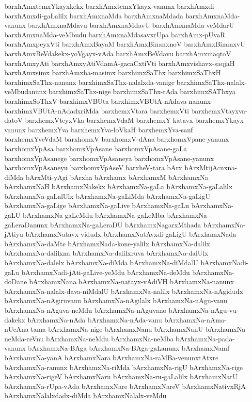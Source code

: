 {barxhAmxtemxYkayxkekx
barxhAmxtemxYkayx-vanunx
barxhAmxdi
barxhAmxdi-gaLalilx
barxhAmxnaMda
barxhAmxnaMdada
barxhAmxnaMda-vanunx
barxhAmxnaMdavu
barxhAmxnaMdavU
barxhAmxnaMda-veMdarU
barxhAmxnaMda-veMbudu
barxhAmxnaMdasavxrUpa
barxhAmx-pUvaR
barxhAmxpeyxVti
barxhAmxBayaM
barxhAmxBinanxnoV
barxhAmxBinanxvU
barxhAmxBeVdakekx-yoVgayx-vAda
barxhAmxBeVdavu
barxhAmxmaqtoV
barxhAmxyAti
barxhAmxyAtiVdamA-gacaCxtiVti
barxhAmxvishavx-saqjaH
barxhAmxsimx
barxhAmxha-masimx
barxhimxSaThx
barxhimxSaThxH
barxhimxSaThx-nanunx
barxhimxSaThx-nalalxda-vanige
barxhimxSaThx-nalalx-veMbudanunx
barxhimxSaThx-nige
barxhimxSaThx-rAda
barxhimxSAThxya
barxhimxSoThxV
barxhimxVBUta
barxhimxVBUtA-nAdava-nanunx
barxhimxVBUtA-nAdadxriMda
barxhemxVtara
barxhemxVti
barxhemxVtayxva-datoV
barxhemxVteyxVka
barxhemxVdaM
barxhemxY-katavx
barxhemxYkayx-vanunx
barxhemxYva
barxhemxYva-loVkaH
barxhemxYva-sanf
barxhemxYveVdaM
barxhomxV
barxhomxV-dAna
barxhomxVpane-yanunx
barxhomxVpAsa
barxhomxVpAsane
barxhomxVpAsane-gaLa
barxhomxVpAsanege
barxhomxVpAsaneya
barxhomxVpAsane-yanunx
barxhomxVpAsaneyu
barxhomxVpAseV
barxheV-tara
bArx
bArxMtijAcnxna-diMda
bArxMti-yAgi
bArxha
bArxhamx
bArxhamxM
bArxhamxNa
bArxhamxNaH
bArxhamxNakekx
bArxhamxNa-gaLa
bArxhamxNa-gaLalilx
bArxhamxNa-gaLalUlx
bArxhamxNa-gaLiMda
bArxhamxNa-gaLigU
bArxhamxNa-gaLige
bArxhamxNa-gaLive
bArxhamxNa-gaLu
bArxhamxNa-gaLU
bArxhamxNa-gaLeMdu
bArxhamxNa-gaLeMba
bArxhamxNa-gaLeraDanunx
bArxhamxNa-gaLeraDU
bArxhamxNagarxMthada
bArxhamxNa-jAtiyu
bArxhamxNatavx-vidudx
bArxhamxNatAvxdi-gaLigU
bArxhamxNada
bArxhamxNa-daMte
bArxhamxNada-kone-yalilx
bArxhamxNa-dalilx
bArxhamxNa-dalilxna
bArxhamxNa-dalilxruva
bArxhamxNa-dalUlx
bArxhamxNa-dalelx
bArxhamxNa-diMda
bArxhamxNa-diMdalU
bArxhamxNadi-gaLu
bArxhamxNadi-jAti-gaLive-yeMdu
bArxhamxNa-deMdu
bArxhamxNa-doDane
bArxhamxNana
bArxhamxNa-natayx-vAdiVH
bArxhamxNa-nanunx
bArxhamxNa-nalalx-dava-niMdalU
bArxhamxNa-nalilx
bArxhamxNa-nAgidudx
bArxhamxNa-nAgiruvanu
bArxhamxNa-nAgilalx
bArxhamxNa-nAgu-vanu
bArxhamxNa-nAguva-neMdu
bArxhamxNa-nAguvano
bArxhamxNa-nAgu-vu-dakekx
bArxhamxNa-nAda
bArxhamxNa-nAda-vanu
bArxhamxNa-nAma-nUcAna-tama
bArxhamxNa-nige
bArxhamxNanu
bArxhamxNanU
bArxhamxNa-neMda-reVnu
bArxhamxNa-neMdu
bArxhamxNa-neMba
bArxhamxNa-pada-vanunx
bArxhamxNa-BAga
bArxhamxNa-BAga-gaLanunx
bArxhamxNamf
bArxhamxNa-yanA
bArxhamxNara
bArxhamxNa-raMBa-venunxtAtxre
bArxhamxNa-ranunx
bArxhamxNa-riMda
bArxhamxNa-rigU
bArxhamxNa-rige
bArxhamxNa-rigeV
bArxhamxNaru
bArxhamxNa-ru-gaLalilx
bArxhamxNarU
bArxhamxNa-rUpa-vAda
bArxhamxNare
bArxhamxNareV
bArxhamxNativxRjA
bArxhamxNalalxdadx-diMda
bArxhamxNalalx-veMdu
}
